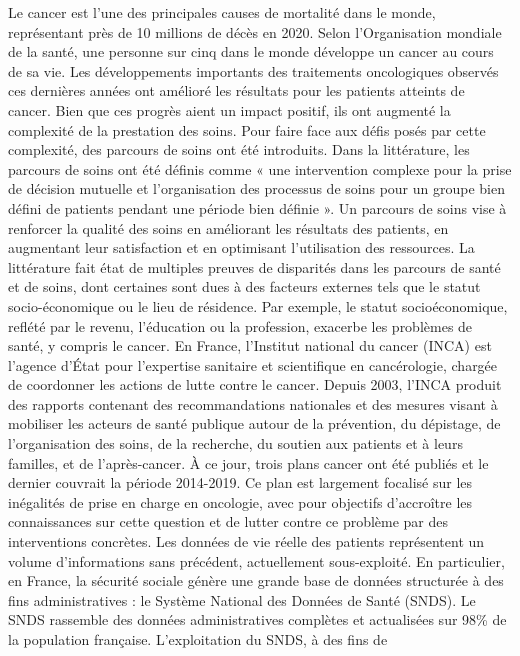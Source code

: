 Le cancer est l'une des principales causes de mortalité dans le monde,
représentant près de 10 millions de décès en 2020. Selon l'Organisation mondiale
de la santé, une personne sur cinq dans le monde développe un cancer au cours de
sa vie. Les développements importants des traitements oncologiques observés ces
dernières années ont amélioré les résultats pour les patients atteints de
cancer. Bien que ces progrès aient un impact positif, ils ont augmenté la
complexité de la prestation des soins. Pour faire face aux défis posés par cette
complexité, des parcours de soins ont été introduits. Dans la littérature, les
parcours de soins ont été définis comme « une intervention complexe pour la
prise de décision mutuelle et l'organisation des processus de soins pour un
groupe bien défini de patients pendant une période bien définie ». Un parcours
de soins vise à renforcer la qualité des soins en améliorant les résultats des
patients, en augmentant leur satisfaction et en optimisant l'utilisation des
ressources. La littérature fait état de multiples preuves de disparités dans les
parcours de santé et de soins, dont certaines sont dues à des facteurs externes
tels que le statut socio-économique ou le lieu de résidence. Par exemple, le
statut socioéconomique, reflété par le revenu, l'éducation ou la profession,
exacerbe les problèmes de santé, y compris le cancer. En France, l'Institut
national du cancer (INCA) est l'agence d'État pour l'expertise sanitaire et
scientifique en cancérologie, chargée de coordonner les actions de lutte contre
le cancer. Depuis 2003, l'INCA produit des rapports contenant des
recommandations nationales et des mesures visant à mobiliser les acteurs de
santé publique autour de la prévention, du dépistage, de l'organisation des
soins, de la recherche, du soutien aux patients et à leurs familles, et de
l'après-cancer. À ce jour, trois plans cancer ont été publiés et le dernier
couvrait la période 2014-2019. Ce plan est largement focalisé sur les inégalités
de prise en charge en oncologie, avec pour objectifs d'accroître les
connaissances sur cette question et de lutter contre ce problème par des
interventions concrètes. Les données de vie réelle des patients représentent un
volume d'informations sans précédent, actuellement sous-exploité. En
particulier, en France, la sécurité sociale génère une grande base de données
structurée à des fins administratives : le Système National des Données de Santé
(SNDS). Le SNDS rassemble des données administratives complètes et actualisées
sur 98\% de la population française. L'exploitation du SNDS, à des fins de
